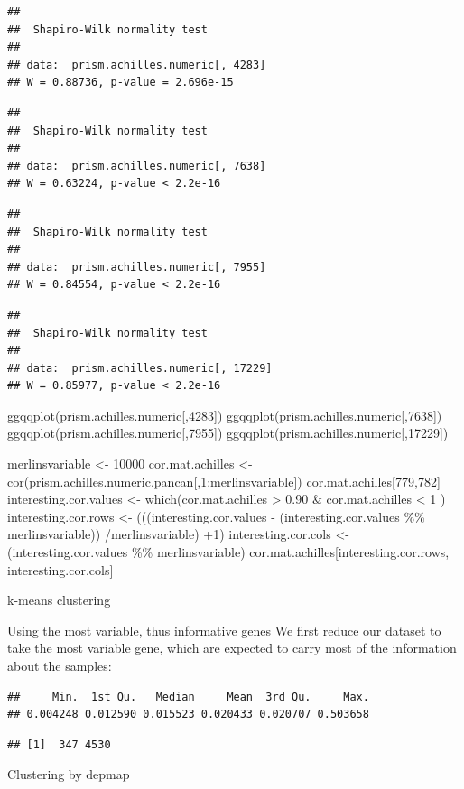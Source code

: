 \documentclass[
]{article}
\begin{document}
\begin{verbatim}
## 
##  Shapiro-Wilk normality test
## 
## data:  prism.achilles.numeric[, 4283]
## W = 0.88736, p-value = 2.696e-15
\end{verbatim}

\begin{verbatim}
## 
##  Shapiro-Wilk normality test
## 
## data:  prism.achilles.numeric[, 7638]
## W = 0.63224, p-value < 2.2e-16
\end{verbatim}

\begin{verbatim}
## 
##  Shapiro-Wilk normality test
## 
## data:  prism.achilles.numeric[, 7955]
## W = 0.84554, p-value < 2.2e-16
\end{verbatim}

\begin{verbatim}
## 
##  Shapiro-Wilk normality test
## 
## data:  prism.achilles.numeric[, 17229]
## W = 0.85977, p-value < 2.2e-16
\end{verbatim}

ggqqplot(prism.achilles.numeric{[},4283{]})
ggqqplot(prism.achilles.numeric{[},7638{]})
ggqqplot(prism.achilles.numeric{[},7955{]})
ggqqplot(prism.achilles.numeric{[},17229{]})

merlinsvariable \textless- 10000 cor.mat.achilles \textless-
cor(prism.achilles.numeric.pancan{[},1:merlinsvariable{]})
cor.mat.achilles{[}779,782{]} interesting.cor.values \textless-
which(cor.mat.achilles \textgreater{} 0.90 \& cor.mat.achilles
\textless{} 1 ) interesting.cor.rows \textless-
(((interesting.cor.values - (interesting.cor.values \%\%
merlinsvariable)) /merlinsvariable) +1) interesting.cor.cols \textless-
(interesting.cor.values \%\% merlinsvariable)
cor.mat.achilles{[}interesting.cor.rows, interesting.cor.cols{]}

k-means clustering

Using the most variable, thus informative genes We first reduce our
dataset to take the most variable gene, which are expected to carry most
of the information about the samples:

\begin{verbatim}
##     Min.  1st Qu.   Median     Mean  3rd Qu.     Max. 
## 0.004248 0.012590 0.015523 0.020433 0.020707 0.503658
\end{verbatim}

\begin{verbatim}
## [1]  347 4530
\end{verbatim}

Clustering by depmap
\end{document}
